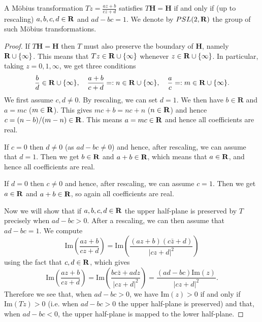 \documentclass[12pt]{article}
\begin{document}
\begin{lma}
  A M\"obius transformation $Tz=\frac{az+b}{cz+d}$ satisfies $T\mathbf{H}=\mathbf{H}$ if and only if (up to rescaling) $a,b,c,d\in\mathbf{R}$ and $ad-bc=1$. We denote by $PSL(2,\mathbf{R})$ the group of such M\"obius transformations.
  \end{lma}
\begin{proof}
  If $T\mathbf{H}=\mathbf{H}$ then $T$ must also preserve the boundary of $\mathbf{H}$, namely $\mathbf{R}\cup\{\infty\}$. This means that $Tz\in\mathbf{R}\cup\{\infty\}$ whenever $z\in\mathbf{R}\cup\{\infty\}$. In particular, taking $z=0,1,\infty$, we get three conditions
  \[\frac{b}{d}\in\mathbf{R}\cup\{\infty\},\quad\frac{a+b}{c+d}=:n\in\mathbf{R}\cup\{\infty\},\quad\frac{a}{c}=:m\in\mathbf{R}\cup\{\infty\}.\]
  We first assume $c,d\neq 0$. By rescaling, we can set $d=1$. We then have $b\in\mathbf{R}$ and $a=mc$ ($m\in\mathbf{R}$). This gives $mc+b=nc+n$ ($n\in\mathbf{R}$) and hence $c=(n-b)/(m-n)\in\mathbf{R}$. This means $a=mc\in\mathbf{R}$ and hence all coefficients are real.

  If $c=0$ then $d\neq 0$ (as $ad-bc\neq 0$) and hence, after rescaling, we can assume that $d=1$. Then we get $b\in\mathbf{R}$ and $a+b\in\mathbf{R}$, which means that $a\in\mathbf{R}$, and hence all coefficients are real.

  If $d=0$ then $c\neq 0$ and hence, after rescaling, we can assume $c=1$. Then we get $a\in\mathbf{R}$ and $a+b\in\mathbf{R}$, so again all coefficients are real.

  Now we will show that if $a,b,c,d\in\mathbf{R}$ the upper half-plane is preserved by $T$ precisely when $ad-bc>0$. After a rescaling, we can then assume that $ad-bc=1$. We compute
  \[\mathrm{Im}\left(\frac{az+b}{cz+d}\right)=\mathrm{Im}\left(\frac{(az+b)(c\bar{z}+d)}{|cz+d|^2}\right)\]
  using the fact that $c,d\in\mathbf{R}$, which gives
  \[\mathrm{Im}\left(\frac{az+b}{cz+d}\right)=\mathrm{Im}\left(\frac{bc\bar{z}+adz}{|cz+d|^2}\right)=\frac{(ad-bc)\mathrm{Im}(z)}{|cz+d|^2}.\]
  Therefore we see that, when $ad-bc>0$, we have $\mathrm{Im}(z)>0$ if and only if $\mathrm{Im}(Tz)>0$ (i.e. when $ad-bc>0$ the upper half-plane is preserved) and that, when $ad-bc<0$, the upper half-plane is mapped to the lower half-plane.
\end{proof}
\end{document}
